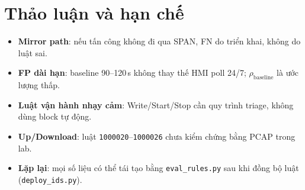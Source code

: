 \documentclass[../main.tex]{subfiles}
\begin{document}
\section{Thảo luận và hạn chế}
\label{sec:eval-discussion}

\begin{itemize}
    \item \textbf{Mirror path}: nếu tấn công không đi qua SPAN, FN do triển khai, không do luật sai.
    \item \textbf{FP dài hạn}: baseline 90--120\,s không thay thế HMI poll 24/7; $\rho_{\mathrm{baseline}}$ là ước lượng thấp.
    \item \textbf{Luật vận hành nhạy cảm}: Write/Start/Stop cần quy trình triage, không dùng block tự động.
    \item \textbf{Up/Download}: luật \texttt{1000020}--\texttt{1000026} chưa kiểm chứng bằng PCAP trong lab.
    \item \textbf{Lặp lại}: mọi số liệu có thể tái tạo bằng \texttt{eval\_rules.py} sau khi đồng bộ luật (\texttt{deploy\_ids.py}).
\end{itemize}
\end{document}

